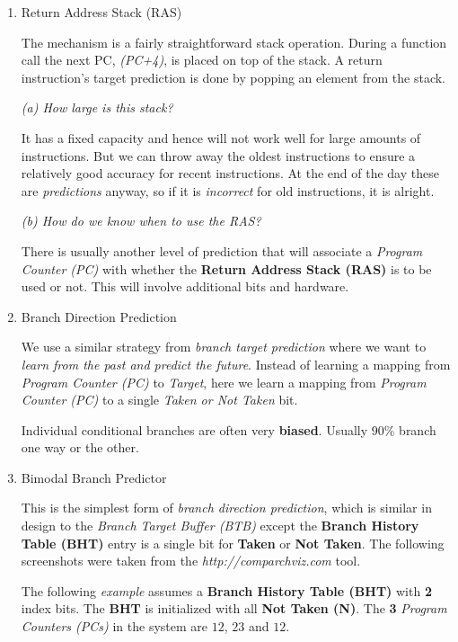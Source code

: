 \documentclass[12pt]{article}
\newenvironment{QandA}{\begin{enumerate}[label=\bfseries\arabic*.]\bfseries}
                      {\end{enumerate}}
\newenvironment{answered}{\par\quad\normalfont}{}
\begin{document}
\begin{QandA}
\item Return Address Stack (RAS)
\begin{answered}
The mechanism is a fairly straightforward stack operation. During a function call the next PC, \textit{(PC+4)}, is placed on top of the stack. A return instruction's target prediction is done by popping an element from the stack.

\textit{(a) How large is this stack?}

It has a fixed capacity and hence will not work well for large amounts of instructions. But we can throw away the oldest instructions to ensure a relatively good accuracy for recent instructions. At the end of the day these are \textit{predictions} anyway, so if it is \textit{incorrect} for old instructions, it is alright.

\textit{(b) How do we know when to use the RAS?}

There is usually another level of prediction that will associate a \textit{Program Counter (PC)} with whether the \textbf{Return Address Stack (RAS)} is to be used or not. This will involve additional bits and hardware. 
\end{answered}

\item Branch Direction Prediction
\begin{answered}
We use a similar strategy from \textit{branch target prediction} where we want to \textit{learn from the past and predict the future}. Instead of learning a mapping from \textit{Program Counter (PC)} to \textit{Target}, here we learn a mapping from \textit{Program Counter (PC)} to a single \textit{Taken or Not Taken} bit. 

Individual conditional branches are often very \textbf{biased}. Usually 90\% branch one way or the other.
\end{answered}

\item Bimodal Branch Predictor
\begin{answered}
This is the simplest form of \textit{branch direction prediction}, which is similar in design to the \textit{Branch Target Buffer (BTB)} except the \textbf{Branch History Table (BHT)} entry is a single bit for \textbf{Taken} or \textbf{Not Taken}. The following screenshots were taken from the \textit{http://comparchviz.com} tool.

The following \textit{example} assumes a \textbf{Branch History Table (BHT)} with \textbf{2} index bits. The \textbf{BHT} is initialized with all \textbf{Not Taken (N)}. The \textbf{3} \textit{Program Counters (PCs)} in the system are $12$, $23$ and $12$.


\end{answered}
\end{QandA}
\end{document}
